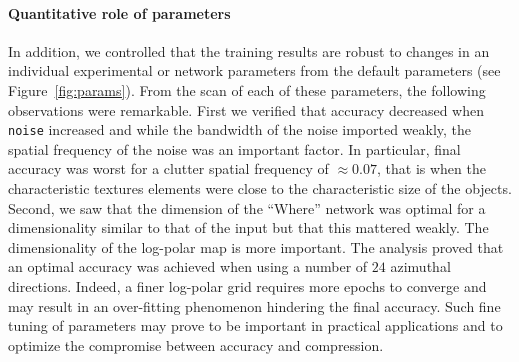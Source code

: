 \paragraph{Quantitative role of parameters}


In addition, we controlled that the training results are robust to changes in an individual experimental or network parameters from the default parameters (see Figure~\ref{fig:params}). From the scan of each of these parameters, the following observations were remarkable. First we verified that accuracy decreased when \texttt{noise} increased and while the bandwidth of the noise imported weakly, the spatial frequency of the noise was an important factor. In particular, final accuracy was worst for a clutter spatial frequency of $\approx 0.07$, that is when the characteristic textures elements were close to the characteristic size of the objects. Second, we saw that the dimension of the ``Where'' network was optimal for a dimensionality similar to that of the input but that this mattered weakly. The dimensionality of the log-polar map is more important. The analysis proved that an optimal accuracy was achieved when using a number of $24$ azimuthal directions. Indeed, a finer log-polar grid requires more epochs to converge and may result in an over-fitting phenomenon hindering the final accuracy. Such fine tuning of parameters may prove to be important in practical applications and to optimize the compromise between accuracy and compression.
